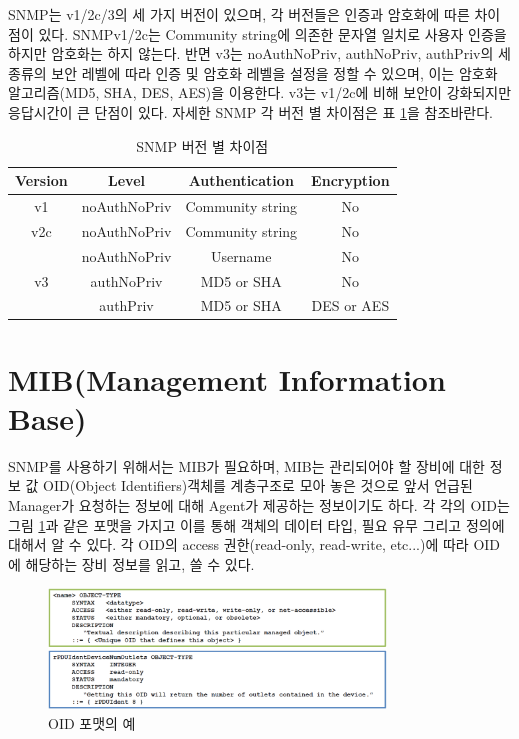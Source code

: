 \documentclass[11pt
  , a4paper
  , article
  , oneside
]{memoir}
\begin{document}
\hfil\break
\hfil\break
\hfil\break
\hfil\break

SNMP는 v1/2c/3의 세 가지 버전이 있으며, 각 버전들은 인증과 암호화에 따른 차이점이 있다. SNMPv1/2c는 Community string에 의존한 문자열 일치로 사용자 인증을 하지만 암호화는 하지 않는다. 반면 v3는 noAuthNoPriv, authNoPriv, authPriv의 세 종류의 보안 레벨에 따라 인증 및 암호화 레벨을 설정을 정할 수 있으며, 이는 암호화 알고리즘(MD5, SHA, DES, AES)을 이용한다. v3는 v1/2c에 비해 보안이 강화되지만 응답시간이 큰 단점이 있다. 자세한 SNMP 각 버전 별 차이점은 표 \ref{table:conparision}\citep{comparison}을 참조바란다.

\begin{table}[h!]
\begin{center}
\begin{tabular}{c|c|c|c}\hline
Version & Level & Authentication & Encryption \\ \hline
v1 & noAuthNoPriv & Community string & No \\ \hline
v2c & noAuthNoPriv & Community string & No \\ \hline
 & noAuthNoPriv & Username & No \\ \cline{2-4}
v3 & authNoPriv & MD5 or SHA & No \\ \cline{2-4}
 & authPriv & MD5 or SHA & DES or AES \\ \hline
\end{tabular}
\caption{SNMP 버전 별 차이점}
  \label{table:conparision} 
\end{center}
\end{table} 

\section{MIB(Management Information Base)}
SNMP를 사용하기 위해서는 MIB가 필요하며, MIB는 관리되어야 할 장비에 대한 정보 값 OID(Object Identifiers)객체를 계층구조로 모아 놓은 것으로 앞서 언급된 Manager가 요청하는 정보에 대해 Agent가 제공하는 정보이기도 하다. 각 각의 OID는 그림 \ref{fig:ex_mib}과 같은 포맷을 가지고 이를 통해 객체의 데이터 타입, 필요 유무 그리고 정의에 대해서 알 수 있다. 각 OID의 access 권한(read-only, read-write, etc...)에 따라 OID에 해당하는 장비 정보를 읽고, 쓸 수 있다.

\begin{figure}[h!]
  \centering
  \includegraphics[width=0.8\textwidth]{./images/ex_mib.eps}
  \caption{OID 포맷의 예}
  \label{fig:ex_mib}   
\end{figure}
\end{document}
